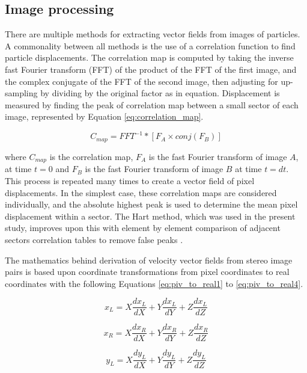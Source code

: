 \subsection{Image processing}

There are multiple methods for extracting vector fields from images of 
particles. A commonality between all methods is the use of a correlation 
function to find particle displacements. The correlation map is computed by 
taking the inverse fast Fourier transform (FFT) of the product of the FFT of 
the first image, and the complex conjugate of the FFT of the second image, then 
adjusting for up-sampling by dividing by the original factor as in equation. 
Displacement is measured by finding the peak of correlation map between a small 
sector of each image, represented by Equation \ref{eq:correlation_map}.

\begin{equation}
C_{map} = FFT^{-1} * [F_A \times conj(F_B) ]
\label{eq:correlation_map}
\end{equation}

where $C_{map}$ is the correlation map, $F_A$ is the fast Fourier transform of 
image $A$, at time $t=0$ and $F_B$ is the fast Fourier transform of image $B$ 
at time $t=dt$. This process is repeated many times to create a vector field of 
pixel displacements. In the simplest case, these correlation maps are 
considered individually, and the absolute highest peak is used to determine the 
mean pixel displacement within a sector. The Hart method, which was used in the 
present study, improves upon this with element by element comparison of 
adjacent sectors correlation tables to remove false peaks 
\cite{hart1998,hart1999}.

The mathematics behind derivation of velocity vector fields from stereo image 
pairs is based upon coordinate transformations from pixel coordinates to real 
coordinates with the following Equations 
\ref{eq:piv_to_real1} to \ref{eq:piv_to_real4}.

\begin{equation}
x_L= X\frac{dx_L}{dX} + Y\frac{dx_L}{dY} + Z\frac{dx_L}{dZ}
\label{eq:piv_to_real1}
\end{equation}

\begin{equation}
x_R= X\frac{dx_R}{dX} + Y\frac{dx_R}{dY} + Z\frac{dx_R}{dZ}
\label{eq:piv_to_real2}
\end{equation}

\begin{equation}
y_L= X\frac{dy_L}{dX} + Y\frac{dy_L}{dY} + Z\frac{dy_L}{dZ}
\label{eq:piv_to_real3}
\end{equation}

